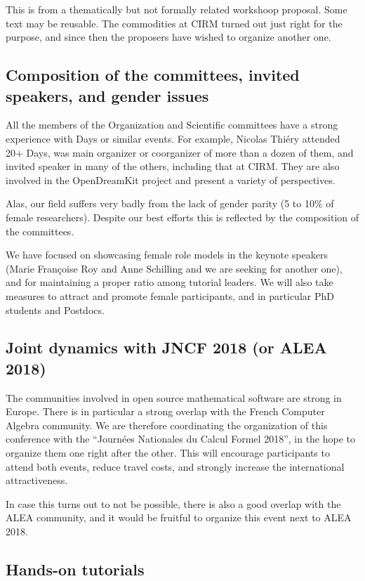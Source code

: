 \begin{oldpart}{This is from a thematically but not formally related workshoop proposal. Some text may be reusable.}
The commodities at CIRM turned out just right for the purpose, and
since then the proposers have wished to organize another one.

\subsection{Composition of the committees, invited speakers, and gender issues}

All the members of the Organization and Scientific committees have a
strong experience with \Sage Days or similar events. For example,
Nicolas Thiéry attended 20+ \Sage Days, was main organizer or
coorganizer of more than a dozen of them, and invited speaker in many
of the others, including that at CIRM. They are also involved in the
OpenDreamKit project and present a variety of perspectives.

Alas, our field suffers very badly from the lack of gender parity (5
to 10\% of female researchers). Despite our best efforts this is reflected by the
composition of the committees.

We have focused on showcasing female role models in the keynote
speakers (Marie Françoise Roy and Anne Schilling and we are seeking
for another one), and for maintaining a proper ratio among tutorial
leaders. We will also take measures to attract and promote female
participants, and in particular PhD students and Postdocs.

\subsection{Joint dynamics with JNCF 2018 (or ALEA 2018)}

The communities involved in open source mathematical software are
strong in Europe. There is in particular a strong overlap with the
French Computer Algebra community. We are therefore coordinating the
organization of this conference with the ``Journées Nationales du
Calcul Formel 2018'', in the hope to organize them one right after the
other. This will encourage participants to attend both events, reduce
travel costs, and strongly increase the international attractiveness.

In case this turns out to not be possible, there is also a good
overlap with the ALEA community, and it would be fruitful to organize
this event next to ALEA 2018.

\subsection{Hands-on tutorials}


\end{oldpart}
